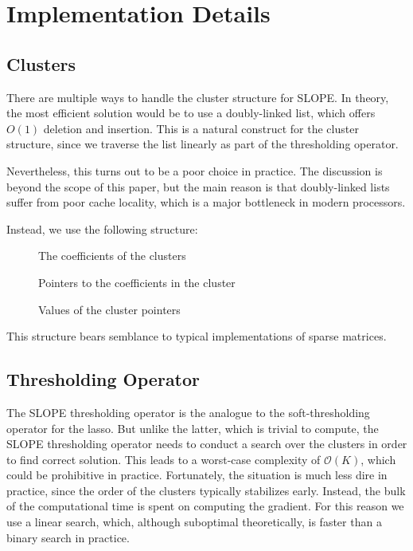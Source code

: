 \documentclass[article]{jss}
\begin{document}
\section{Implementation Details}

\subsection{Clusters}

There are multiple ways to handle the cluster structure for SLOPE.
In theory, the most efficient solution would be to use a
doubly-linked list, which offers \(O(1)\) deletion and insertion.
This is a natural construct for the cluster structure, since we
traverse the list linearly as part of the thresholding operator.

Nevertheless, this turns out to be a poor choice in practice.
The discussion is beyond the scope of this paper, but the main
reason is that doubly-linked lists suffer from poor cache
locality, which is a major bottleneck in modern processors.

Instead, we use the following structure:

\begin{description}
  \item[] The coefficients of the clusters
  \item[] Pointers to the coefficients in the cluster
  \item[] Values of the cluster pointers
\end{description}

This structure bears semblance to typical implementations of
sparse matrices.

\subsection{Thresholding Operator}

The SLOPE thresholding operator is the analogue to the
soft-thresholding operator for the lasso. But unlike the
latter, which is trivial to compute, the SLOPE thresholding operator
needs to conduct a search over the clusters in order to find correct
solution. This leads to a worst-case complexity of
\(\mathcal{O}(K)\), which could be prohibitive in practice.
Fortunately, the situation is much less dire in practice, since
the order of the clusters typically stabilizes early. Instead, the
bulk of the computational time is spent on computing the gradient.
For this reason we use a linear search, which, although suboptimal
theoretically, is faster than a binary search in practice.
\end{document}
